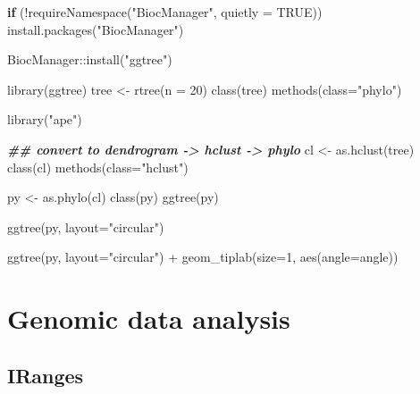 \documentclass[
]{book}
\newenvironment{Shaded}{\begin{snugshade}}{\end{snugshade}}
\newcommand{\AttributeTok}[1]{\textcolor[rgb]{0.77,0.63,0.00}{#1}}
\newcommand{\ConstantTok}[1]{\textcolor[rgb]{0.00,0.00,0.00}{#1}}
\newcommand{\ControlFlowTok}[1]{\textcolor[rgb]{0.13,0.29,0.53}{\textbf{#1}}}
\newcommand{\DecValTok}[1]{\textcolor[rgb]{0.00,0.00,0.81}{#1}}
\newcommand{\DocumentationTok}[1]{\textcolor[rgb]{0.56,0.35,0.01}{\textbf{\textit{#1}}}}
\newcommand{\FunctionTok}[1]{\textcolor[rgb]{0.00,0.00,0.00}{#1}}
\newcommand{\NormalTok}[1]{#1}
\newcommand{\OtherTok}[1]{\textcolor[rgb]{0.56,0.35,0.01}{#1}}
\newcommand{\SpecialCharTok}[1]{\textcolor[rgb]{0.00,0.00,0.00}{#1}}
\newcommand{\StringTok}[1]{\textcolor[rgb]{0.31,0.60,0.02}{#1}}
\begin{document}
\begin{Shaded}
\begin{Highlighting}[]
\ControlFlowTok{if}\NormalTok{ (}\SpecialCharTok{!}\FunctionTok{requireNamespace}\NormalTok{(}\StringTok{"BiocManager"}\NormalTok{, }\AttributeTok{quietly =} \ConstantTok{TRUE}\NormalTok{))}
    \FunctionTok{install.packages}\NormalTok{(}\StringTok{"BiocManager"}\NormalTok{)}

\NormalTok{BiocManager}\SpecialCharTok{::}\FunctionTok{install}\NormalTok{(}\StringTok{"ggtree"}\NormalTok{)}

\FunctionTok{library}\NormalTok{(ggtree)}
\NormalTok{tree }\OtherTok{\textless{}{-}} \FunctionTok{rtree}\NormalTok{(}\AttributeTok{n =} \DecValTok{20}\NormalTok{)}
\FunctionTok{class}\NormalTok{(tree)           }
\FunctionTok{methods}\NormalTok{(}\AttributeTok{class=}\StringTok{"phylo"}\NormalTok{)}

\FunctionTok{library}\NormalTok{(}\StringTok{"ape"}\NormalTok{)}

\DocumentationTok{\#\# convert to dendrogram {-}\textgreater{} hclust {-}\textgreater{} phylo }
\NormalTok{cl }\OtherTok{\textless{}{-}} \FunctionTok{as.hclust}\NormalTok{(tree)}
\FunctionTok{class}\NormalTok{(cl)}
\FunctionTok{methods}\NormalTok{(}\AttributeTok{class=}\StringTok{"hclust"}\NormalTok{)}

\NormalTok{py }\OtherTok{\textless{}{-}} \FunctionTok{as.phylo}\NormalTok{(cl)}
\FunctionTok{class}\NormalTok{(py)}
\FunctionTok{ggtree}\NormalTok{(py)}

\FunctionTok{ggtree}\NormalTok{(py, }\AttributeTok{layout=}\StringTok{"circular"}\NormalTok{)}

\FunctionTok{ggtree}\NormalTok{(py, }\AttributeTok{layout=}\StringTok{"circular"}\NormalTok{) }\SpecialCharTok{+}
  \FunctionTok{geom\_tiplab}\NormalTok{(}\AttributeTok{size=}\DecValTok{1}\NormalTok{, }\FunctionTok{aes}\NormalTok{(}\AttributeTok{angle=}\NormalTok{angle))}
\end{Highlighting}
\end{Shaded}

\hypertarget{genomic-data-analysis}{%
\chapter{Genomic data analysis}\label{genomic-data-analysis}}

\hypertarget{iranges}{%
\section{IRanges}\label{iranges}}
\end{document}
